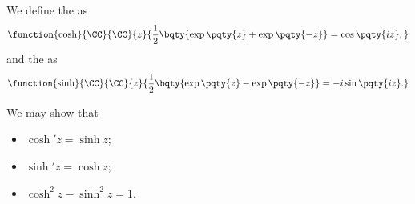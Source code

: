 \begin{definition}
    We define the  as
    \[
        \function{\cosh}{\CC}{\CC}{z}{\frac{1}{2} \bqty{\exp \pqty{z} + \exp \pqty{-z}} = \cos \pqty{iz},}
    \]
    and the  as 
    \[
        \function{\sinh}{\CC}{\CC}{z}{\frac{1}{2} \bqty{\exp \pqty{z} - \exp \pqty{-z}} = - i \sin \pqty{iz}.}
    \]
\end{definition}

We may show that
\begin{itemize}
    \item \(\cosh' z = \sinh z\);
    \item \(\sinh' z = \cosh z\);
    \item \(\cosh^2 z - \sinh^2 z = 1\).
\end{itemize}
